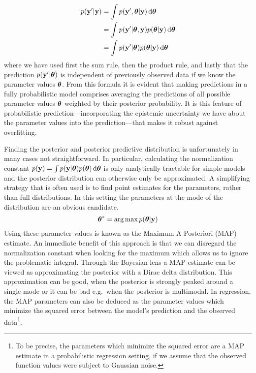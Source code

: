 \documentclass[../thesis.tex]{subfiles}
\begin{document}
\begin{equation}
    \begin{split}
        p(\boldsymbol{\mathbf{y}}' | \boldsymbol{\mathbf{y}}) &= \int p(\boldsymbol{\mathbf{y}}', \boldsymbol{\mathbf{\theta}} | \boldsymbol{\mathbf{y}}) \mathop{}\!\mathrm{d} \boldsymbol{\mathbf{\theta}} \\
        &=\int p(\boldsymbol{\mathbf{y}}' | \boldsymbol{\mathbf{\theta}}, \boldsymbol{\mathbf{y}}) p(\boldsymbol{\mathbf{\theta}} | \boldsymbol{\mathbf{y}}) \mathop{}\!\mathrm{d}\boldsymbol{\mathbf{\theta}} \\
        &= \int p(\boldsymbol{\mathbf{y}}' | \boldsymbol{\mathbf{\theta}}) p(\boldsymbol{\mathbf{\theta}} | \boldsymbol{\mathbf{y}}) \mathop{}\!\mathrm{d}\boldsymbol{\mathbf{\theta}}
    \end{split}
\end{equation}
where we have used first the sum rule, then the product rule, and lastly that the prediction $p(\boldsymbol{\mathbf{y}}' | \boldsymbol{\mathbf{\theta}})$ is independent of previously observed data if we know the parameter values $\boldsymbol{\mathbf{\theta}}$. From this formula it is evident that making predictions in a fully probabilistic model comprises averaging the predictions of all possible parameter values $\boldsymbol{\mathbf{\theta}}$ weighted by their posterior probability. It is this feature of probabilistic prediction---incorporating the epistemic uncertainty we have about the parameter values into the prediction---that makes it robust against overfitting. 

Finding the posterior and posterior predictive distribution is unfortunately in many cases not straightforward. In particular, calculating the normalization constant $p(\boldsymbol{\mathbf{y}})=\int p(\boldsymbol{\mathbf{y}} | \boldsymbol{\mathbf{\theta}}) p(\boldsymbol{\mathbf{\theta}}) \mathop{}\!\mathrm{d}\boldsymbol{\mathbf{\theta}}$ is only analytically tractable for simple models and the posterior distribution can otherwise only be approximated. A simplifying strategy that is often used is to find point estimates for the parameters, rather than full distributions. In this setting the parameters at the mode of the distribution are an obvious candidate.
\begin{equation}
    \begin{split}
        \boldsymbol{\mathbf{\theta}}^{*} = \operatorname*{arg\,max} p(\boldsymbol{\mathbf{\theta}} | \boldsymbol{\mathbf{y}})
    \end{split}
\end{equation}
Using these parameter values is known as the Maximum A Posteriori (MAP) estimate. An immediate benefit of this approach is that we can disregard the normalization constant when looking for the maximum which allows us to ignore the problematic integral. Through the Bayesian lens a MAP estimate can be viewed as approximating the posterior with a Dirac delta distribution. This approximation can be good, when the posterior is strongly peaked around a single mode or it can be bad e.g.\ when the posterior is multimodal. In regression, the MAP parameters can also be deduced as the parameter values which minimize the squared error between the model's prediction and the observed data\footnote{To be precise, the parameters which minimize the squared error are a MAP estimate in a probabilistic regression setting, if we assume that the observed function values were subject to Gaussian noise.}. 
\end{document}
